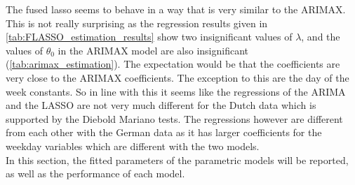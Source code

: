 The fused lasso seems to behave in a way that is very similar to the ARIMAX. This is not really surprising as the regression results given in \autoref{tab:FLASSO_estimation_results} show two insignificant values of $\lambda$, and the values of $\theta_0$ in the ARIMAX model are also insignificant (\autoref{tab:arimax_estimation}). The expectation would be that the coefficients are very close to the ARIMAX coefficients. The exception to this are the day of the week constants. So in line with this it seems like the regressions of the ARIMA and the LASSO are not very much different for the Dutch data which is supported by the Diebold Mariano tests. The regressions however are different from each other with the German data as it has larger coefficients for the weekday variables which are different with the two models.\\


\label{seq:results}
In this section, the fitted parameters of the parametric models will be reported, as well as the performance of each model.
